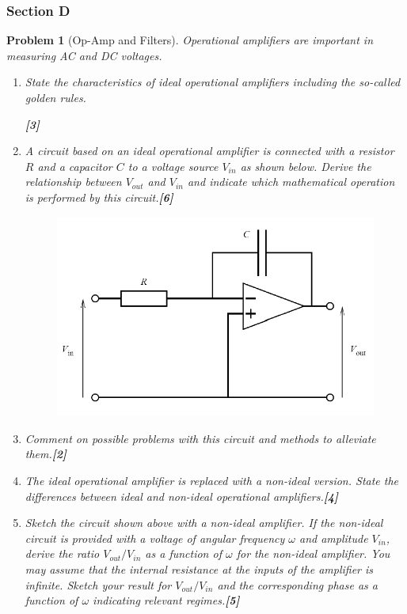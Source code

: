 \documentclass[a4paper]{article}
\theoremstyle{new}
\newtheorem{qns}{Problem}[subsection]
\begin{document}
\subsubsection{Section D}
\begin{qns}[Op-Amp and Filters]
Operational amplifiers are important in measuring AC and DC voltages.
\begin{enumerate}[label=(\alph*)]
\item State the characteristics of ideal operational amplifiers including the so-called golden rules.

\hfill\textbf{[3]}
\item A circuit based on an ideal operational amplifier is connected with a resistor $R$ and a capacitor $C$ to a voltage source $V_{in}$ as shown below. Derive the relationship between $V_{out}$ and $V_{in}$ and indicate which mathematical operation is performed by this circuit.\hfill\textbf{[6]}
\begin{figure}[H]
    \centering
    \includegraphics[scale=0.5]{2019P1D12Q.PNG}
\end{figure}
\item Comment on possible problems with this circuit and methods to alleviate them.\hfill\textbf{[2]}
\item The ideal operational amplifier is replaced with a non-ideal version. State the differences between ideal and non-ideal operational amplifiers.\hfill\textbf{[4]}
\item Sketch the circuit shown above with a non-ideal amplifier. If the non-ideal circuit is provided with a voltage of angular frequency $\omega$ and amplitude $V_{in}$, derive the ratio $V_{out}/V_{in}$ as a function of $\omega$ for the non-ideal amplifier. You may assume that the internal resistance at the inputs of the amplifier is infinite. Sketch your result for $V_{out}/V_{in}$ and the corresponding phase as a function of $\omega$ indicating relevant regimes.\hfill\textbf{[5]}
\end{enumerate}
\end{qns}
\end{document}

